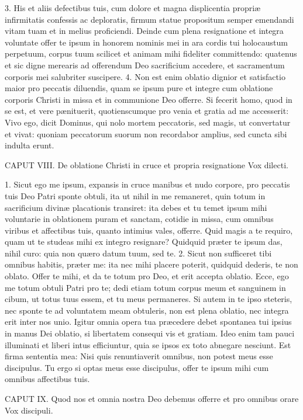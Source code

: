 \documentclass[twoside]{article}
\begin{document}
3. His et aliis defectibus tuis, cum dolore et magna displicentia propriæ infirmitatis confessis ac deploratis, firmum statue propositum semper emendandi vitam tuam et in melius proficiendi. Deinde cum plena resignatione et integra voluntate offer te ipsum in honorem nominis mei in ara cordis tui holocaustum perpetuum, corpus tuum scilicet et animam mihi fideliter committendo: quatenus et sic digne merearis ad offerendum Deo sacrificium accedere, et sacramentum corporis mei salubriter suscipere.
4. Non est enim oblatio dignior et satisfactio maior pro peccatis diluendis, quam se ipsum pure et integre cum oblatione corporis Christi in missa et in communione Deo offerre. Si fecerit homo, quod in se est, et vere pænituerit, quotienscumque pro venia et gratia ad me accesserit: Vivo ego, dicit Dominus, qui nolo mortem peccatoris, sed magis, ut convertatur et vivat: quoniam peccatorum suorum non recordabor amplius, sed cuncta sibi indulta erunt.


CAPUT VIII.
De oblatione Christi in cruce et propria resignatione
Vox dilecti.

1. Sicut ego me ipsum, expansis in cruce manibus et nudo corpore, pro peccatis tuis Deo Patri sponte obtuli, ita ut nihil in me remaneret, quin totum in sacrificium divinæ placationis transiret: ita debes et tu temet ipsum mihi voluntarie in oblationem puram et sanctam, cotidie in missa, cum omnibus viribus et affectibus tuis, quanto intimius vales, offerre. Quid magis a te requiro, quam ut te studeas mihi ex integro resignare? Quidquid præter te ipsum das, nihil curo: quia non quæro datum tuum, sed te.
2. Sicut non sufficeret tibi omnibus habitis, præter me: ita nec mihi placere poterit, quidquid dederis, te non oblato. Offer te mihi, et da te totum pro Deo, et erit accepta oblatio. Ecce, ego me totum obtuli Patri pro te; dedi etiam totum corpus meum et sanguinem in cibum, ut totus tuus essem, et tu meus permaneres. Si autem in te ipso steteris, nec sponte te ad voluntatem meam obtuleris, non est plena oblatio, nec integra erit inter nos unio. Igitur omnia opera tua præcedere debet spontanea tui ipsius in manus Dei oblatio, si libertatem consequi vis et gratiam. Ideo enim tam pauci illuminati et liberi intus efficiuntur, quia se ipsos ex toto abnegare nesciunt. Est firma sententia mea: Nisi quis renuntiaverit omnibus, non potest meus esse discipulus. Tu ergo si optas meus esse discipulus, offer te ipsum mihi cum omnibus affectibus tuis.


CAPUT IX.
Quod nos et omnia nostra Deo debemus offerre et pro omnibus orare
Vox discipuli.
\end{document}
